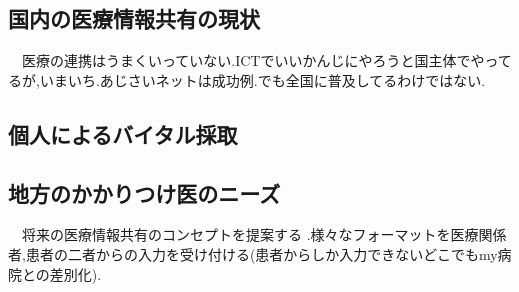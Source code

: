 \subsection{国内の医療情報共有の現状}
　医療の連携はうまくいっていない.ICTでいいかんじにやろうと国主体でやってるが,いまいち.あじさいネットは成功例.でも全国に普及してるわけではない.\cite{bibi3}

\subsection{個人によるバイタル採取}

\subsection{地方のかかりつけ医のニーズ}
　将来の医療情報共有のコンセプトを提案する .様々なフォーマットを医療関係者,患者の二者からの入力を受け付ける(患者からしか入力できないどこでもmy病院との差別化).


